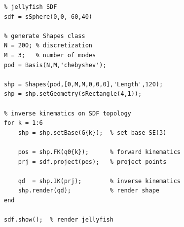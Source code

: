 \begin{lstlisting}[style=matlab] 
%% EXAMPLE: Shapes class (forwards/inverse kinematics) 
% jellyfish SDF
sdf = sSphere(0,0,-60,40) 

% generate Shapes class 
N = 200; % discretization
M = 3;   % number of modes
pod = Basis(N,M,'chebyshev');     

shp = Shapes(pod,[0,M,M,0,0,0],'Length',120);
shp = shp.setGeometry(sRectangle(4,1));

% inverse kinematics on SDF topology
for k = 1:6
    shp = shp.setBase(G{k});  % set base SE(3)

    pos = shp.FK(q0{k});      % forward kinematics 
    prj = sdf.project(pos);   % project points

    qd  = shp.IK(prj);        % inverse kinematics 
    shp.render(qd);           % render shape
end

sdf.show();  % render jellyfish
\end{lstlisting}